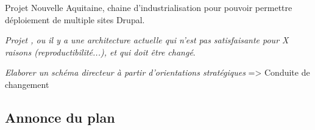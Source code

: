 Projet Nouvelle Aquitaine, chaine d'industrialisation pour pouvoir permettre déploiement de multiple sites Drupal.

\textit{Projet \bv{}, ou il y a une architecture actuelle qui n'est pas satisfaisante pour X raisons (reproductibilité...), et qui doit être changé}.

\textit{Elaborer un schéma directeur à partir d’orientations stratégiques} => Conduite de changement


\subsection{Annonce du plan}

